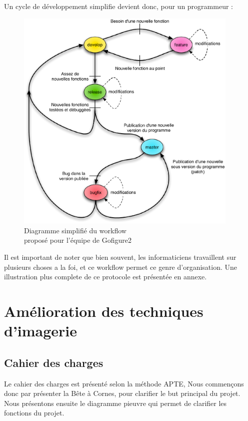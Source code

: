 Un cycle de développement simplifie devient donc, pour un programmeur :
\begin{figure}[H]
\begin{center}
\leavevmode
\includegraphics[width=0.95\textwidth]{pictures/GIT_WorkflowSimple}
\end{center}
\caption{Diagramme simplifié du workflow \\ proposé pour l'équipe de Gofigure2}
\label{fig:Workflow GIT de Gofigure2}
\end{figure}

Il est important de noter que bien souvent, les informaticiens travaillent sur plusieurs choses a la foi, et ce workflow permet ce genre d'organisation. 
Une illustration plus complete de ce protocole est présentée en annexe.







\section{Amélioration des techniques d'imagerie}



\subsection{Cahier des charges}
Le cahier des charges est présenté selon la méthode {APTE\textregistered}, Nous commençons donc par présenter la Bête à Cornes,
pour clarifier le but principal du projet. Nous présentons ensuite le diagramme pieuvre qui permet de clarifier les fonctions du projet.

